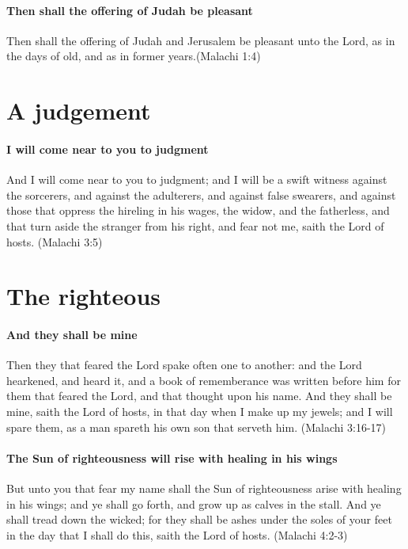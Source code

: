 \paragraph{Then shall the offering of Judah be pleasant}
Then shall the offering of Judah and Jerusalem be pleasant unto the Lord, as in the days of old, and as in former years.(Malachi 1:4)

\section{A judgement}

\paragraph{I will come near to you to judgment}
And I will come near to you to judgment; and I will be a swift witness against the sorcerers, and against the adulterers, and against false swearers, and against those that oppress the hireling in his wages, the widow, and the fatherless, and that turn aside the stranger from his right, and fear not me, saith the Lord of hosts. (Malachi 3:5)

\section{The righteous}

\paragraph{And they shall be mine}
Then they that feared the Lord spake often one to another: and the Lord hearkened, and heard it, and a book of rememberance was written before him for them that feared the Lord, and that thought upon his name. And they shall be mine, saith the Lord of hosts, in that day when I make up my jewels; and I will spare them, as a man spareth his own son that serveth him. (Malachi 3:16-17)

\paragraph{The Sun of righteousness will rise with healing in his wings}
But unto you that fear my name shall the Sun of righteousness arise with healing in his wings; and ye shall go forth, and grow up as calves in the stall. And ye shall tread down the wicked; for they shall be ashes under the soles of your feet in the day that I shall do this, saith the Lord of hosts. (Malachi 4:2-3)

